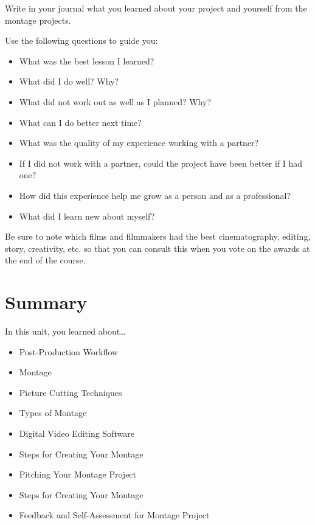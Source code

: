 \documentclass[
]{book}
\providecommand{\tightlist}{%
  \setlength{\itemsep}{0pt}\setlength{\parskip}{0pt}}
\begin{document}
\begin{reflect}
Write in your journal what you learned about your project and yourself from the montage projects.

Use the following questions to guide you:

\begin{itemize}
\tightlist
\item
  What was the best lesson I learned?\\
\item
  What did I do well? Why?\\
\item
  What did not work out as well as I planned? Why?\\
\item
  What can I do better next time?\\
\item
  What was the quality of my experience working with a partner?\\
\item
  If I did not work with a partner, could the project have been better if I had one?\\
\item
  How did this experience help me grow as a person and as a professional?\\
\item
  What did I learn new about myself?
\end{itemize}

Be sure to note which films and filmmakers had the best cinematography, editing, story, creativity, etc. so that you can consult this when you vote on the awards at the end of the course.
\end{reflect}

\hypertarget{summary-6}{%
\section*{Summary}\label{summary-6}}

In this unit, you learned about\ldots{}

\begin{itemize}
\tightlist
\item
  Post-Production Workflow\\
\item
  Montage\\
\item
  Picture Cutting Techniques\\
\item
  Types of Montage\\
\item
  Digital Video Editing Software\\
\item
  Steps for Creating Your Montage\\
\item
  Pitching Your Montage Project\\
\item
  Steps for Creating Your Montage\\
\item
  Feedback and Self-Assessment for Montage Project
\end{itemize}
\end{document}
